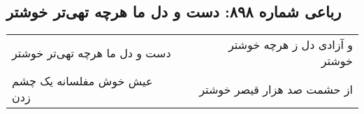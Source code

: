 \begin{center}
\section*{رباعی شماره ۸۹۸: دست و دل ما هرچه تهی‌تر خوشتر}
\label{sec:0898}
\begin{longtable}{l p{0.5cm} r}
دست و دل ما هرچه تهی‌تر خوشتر
&&
و آزادی دل ز هرچه خوشتر خوشتر
\\
عیش خوش مفلسانه یک چشم زدن
&&
از حشمت صد هزار قیصر خوشتر
\\
\end{longtable}
\end{center}
